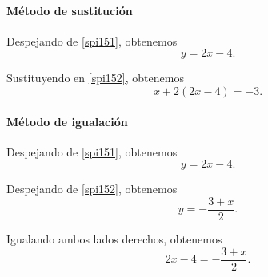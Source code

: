 	\paragraph{M\'etodo de sustituci\'on}
	Despejando de \eqref{spi151}, obtenemos
	$$y=2x-4.$$

	Sustituyendo en \eqref{spi152}, obtenemos
	$$
	x+2(2x-4)=-3.
	$$



	\paragraph{M\'etodo de igualaci\'on}
	Despejando de \eqref{spi151}, obtenemos
	$$y=2x-4.$$

	Despejando de \eqref{spi152}, obtenemos
	$$y=-\dfrac{3+x}{2}.$$

	Igualando ambos lados derechos, obtenemos
	$$
	2x-4=-\dfrac{3+x}{2}.
	$$








